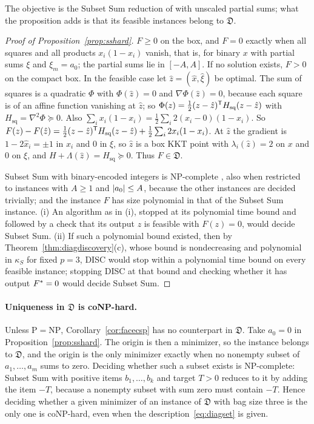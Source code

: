 The objective is the Subset Sum reduction of
\cite[Remark~2]{DelPiaKhajavirad2026} with unscaled partial sums; what the
proposition adds is that its feasible instances belong to $\mathfrak D$.

\begin{proof}[Proof of Proposition~\ref{prop:sshard}]
$F\ge0$ on the box, and $F=0$ exactly when all squares and all products
$x_i(1-x_i)$ vanish, that is, for binary $x$ with partial sums $\xi$ and
$\xi_m=a_0$; the partial sums lie in $[-A,A]$. If no solution exists, $F>0$
on the compact box. In the feasible case let $\hat z=(\hat x,\hat\xi)$ be
optimal. The sum of squares is a quadratic $\Phi$ with $\Phi(\hat z)=0$ and
$\nabla\Phi(\hat z)=0$, because each square is of an affine function
vanishing at $\hat z$; so $\Phi(z)=\frac12(z-\hat z)^{\mathsf T}H_{\mathrm{sq}}
(z-\hat z)$ with $H_{\mathrm{sq}}=\nabla^2\Phi\succeq0$. Also
$\sum_ix_i(1-x_i)=\frac12\sum_i2(x_i-0)(1-x_i)$. So
$F(z)-F(\hat z)=\frac12(z-\hat z)^{\mathsf T}H_{\mathrm{sq}}(z-\hat z)
+\frac12\sum_i2x_i(1-x_i)$. At $\hat z$ the gradient is $1-2\hat x_i=\pm1$ in
$x_i$ and $0$ in $\xi$, so $\hat z$ is a box KKT point with
$\lambda_i(\hat z)=2$ on $x$ and $0$ on $\xi$, and
$H+\Lambda(\hat z)=H_{\mathrm{sq}}\succeq0$. Thus $F\in\mathfrak D$.

Subset Sum with binary-encoded integers is NP-complete
\cite{GareyJohnson1979}, also when restricted to instances with $A\ge1$ and
$\lvert a_0\rvert\le A$, because the other instances are decided trivially; and the
instance $F$ has size polynomial in that of the Subset Sum instance. (i) An
algorithm as in (i), stopped at its polynomial time bound and followed by a
check that its output $z$ is feasible with $F(z)=0$, would decide Subset Sum. (ii) If such a polynomial
bound existed, then by Theorem~\ref{thm:diagdiscovery}(c), whose bound is
nondecreasing and polynomial in $\kappa_S$ for fixed $p=3$, DISC would stop
within a polynomial time bound on every feasible instance; stopping DISC at
that bound and checking whether it has output $F^{*}=0$ would decide Subset Sum.
\end{proof}

\paragraph{Uniqueness in $\mathfrak D$ is coNP-hard.}
Unless $\mathrm P=\mathrm{NP}$, Corollary~\ref{cor:facecsp} has no
counterpart in $\mathfrak D$. Take $a_0=0$ in Proposition~\ref{prop:sshard}. The origin is then a minimizer, so
the instance belongs to $\mathfrak D$, and the origin is the only minimizer
exactly when no nonempty subset of $a_1,\ldots,a_m$ sums to zero. Deciding
whether such a subset exists is NP-complete: Subset Sum with positive items
$b_1,\ldots,b_k$ and target $T>0$ reduces to it by adding the item $-T$,
because a nonempty subset with sum zero must contain $-T$. Hence deciding
whether a given minimizer of an instance of $\mathfrak D$ with bag size three
is the only one is coNP-hard, even when the description~\eqref{eq:diagset} is
given.
